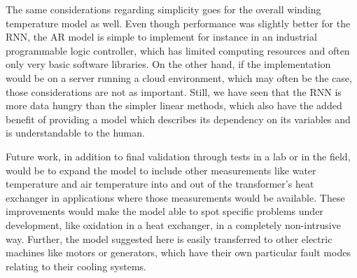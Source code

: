 \documentclass[]{article}
\begin{document}
The same considerations regarding simplicity goes for the overall winding temperature model as well. Even though performance was slightly better for the RNN, the AR model is simple to implement for instance in an industrial programmable logic controller, which has limited computing resources and often only very basic software libraries. On the other hand, if the implementation would be on a server running a cloud environment, which may often be the case, those considerations are not as important. Still, we have seen that the RNN is more data hungry than the simpler linear methods, which also have the added benefit of providing a model which describes its dependency on its variables and is understandable to the human.

Future work, in addition to final validation through tests in a lab or in the field, would be to expand the model to include other measurements like water temperature and air temperature into and out of the transformer's heat exchanger in applications where those measurements would be available. These improvements would make the model able to spot specific problems under development, like oxidation in a heat exchanger, in a completely non-intrusive way. Further, the model suggested here is easily transferred to other electric machines like motors or generators, which have their own particular fault modes relating to their cooling systems.





\end{document}
